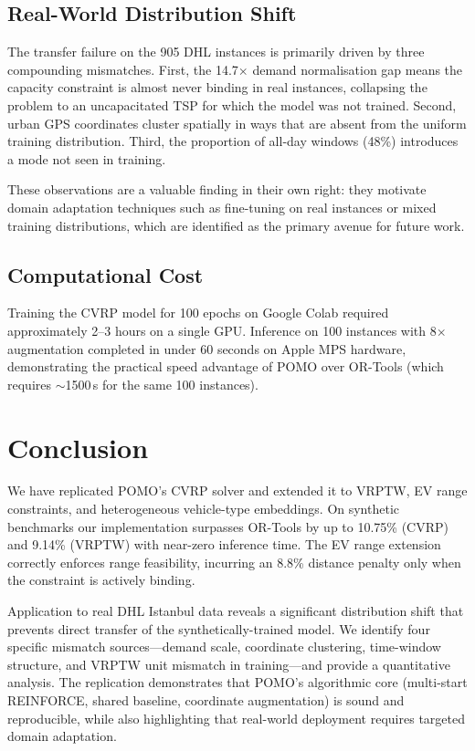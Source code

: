 \documentclass[conference]{IEEEtran}
\begin{document}
\subsection{Real-World Distribution Shift}

The transfer failure on the 905 DHL instances is primarily driven by three
compounding mismatches. First, the 14.7$\times$ demand normalisation gap
means the capacity constraint is almost never binding in real instances,
collapsing the problem to an uncapacitated TSP for which the model was not
trained. Second, urban GPS coordinates cluster spatially in ways that are
absent from the uniform training distribution. Third, the proportion of
all-day windows (48\%) introduces a mode not seen in training.

These observations are a valuable finding in their own right: they motivate
domain adaptation techniques such as fine-tuning on real instances or mixed
training distributions, which are identified as the primary avenue for
future work.

\subsection{Computational Cost}

Training the CVRP model for 100 epochs on Google Colab required
approximately 2--3 hours on a single GPU. Inference on 100 instances with
8$\times$ augmentation completed in under 60 seconds on Apple MPS hardware,
demonstrating the practical speed advantage of POMO over OR-Tools (which
requires $\sim$1500\,s for the same 100 instances).

\section{Conclusion}

We have replicated POMO's CVRP solver and extended it to VRPTW, EV range
constraints, and heterogeneous vehicle-type embeddings. On synthetic
benchmarks our implementation surpasses OR-Tools by up to 10.75\% (CVRP)
and 9.14\% (VRPTW) with near-zero inference time. The EV range extension
correctly enforces range feasibility, incurring an 8.8\% distance penalty
only when the constraint is actively binding.

Application to real DHL Istanbul data reveals a significant distribution
shift that prevents direct transfer of the synthetically-trained model.
We identify four specific mismatch sources---demand scale, coordinate
clustering, time-window structure, and VRPTW unit mismatch in training---and
provide a quantitative analysis. The replication demonstrates that POMO's
algorithmic core (multi-start REINFORCE, shared baseline, coordinate
augmentation) is sound and reproducible, while also highlighting that
real-world deployment requires targeted domain adaptation.
\end{document}
